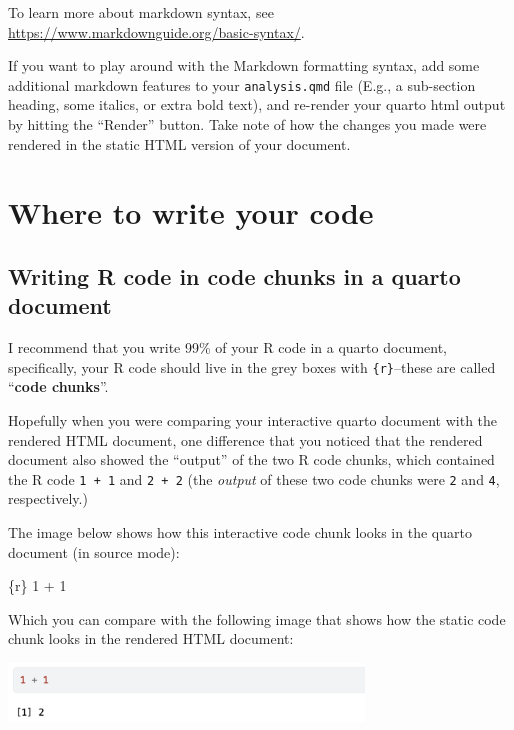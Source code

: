 \documentclass[
  letterpaper,
  DIV=11,
  numbers=noendperiod]{scrreprt}
\newenvironment{Shaded}{\begin{snugshade}}{\end{snugshade}}
\newcommand{\InformationTok}[1]{\textcolor[rgb]{0.37,0.37,0.37}{#1}}
\begin{document}
To learn more about markdown syntax, see
\url{https://www.markdownguide.org/basic-syntax/}.

If you want to play around with the Markdown formatting syntax, add some
additional markdown features to your \texttt{analysis.qmd} file (E.g., a
sub-section heading, some italics, or extra bold text), and re-render
your quarto html output by hitting the ``Render'' button. Take note of
how the changes you made were rendered in the static HTML version of
your document.

\section{Where to write your code}\label{where-to-write-your-code}

\subsection{Writing R code in code chunks in a quarto
document}\label{writing-r-code-in-code-chunks-in-a-quarto-document}

I recommend that you write 99\% of your R code in a quarto document,
specifically, your R code should live in the grey boxes with
\texttt{\{r\}}--these are called ``\textbf{code chunks}''.

Hopefully when you were comparing your interactive quarto document with
the rendered HTML document, one difference that you noticed that the
rendered document also showed the ``output'' of the two R code chunks,
which contained the R code \texttt{1\ +\ 1} and \texttt{2\ +\ 2} (the
\emph{output} of these two code chunks were \texttt{2} and \texttt{4},
respectively.)

The image below shows how this interactive code chunk looks in the
quarto document (in source mode):

\begin{Shaded}
\begin{Highlighting}[]
\InformationTok{\textasciigrave{}\textasciigrave{}\textasciigrave{}\{r\}}
\InformationTok{1 + 1}
\InformationTok{\textasciigrave{}\textasciigrave{}\textasciigrave{}}
\end{Highlighting}
\end{Shaded}

Which you can compare with the following image that shows how the static
code chunk looks in the rendered HTML document:

\includegraphics[width=3.72in,height=\textheight]{figures/chunk_html.png}
\end{document}
